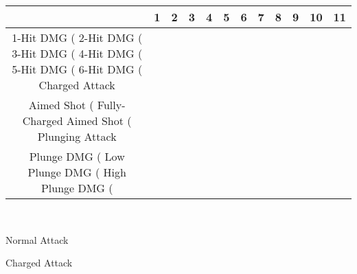 \documentclass[a4paper,12pt]{article}
\begin{document}
\begin{tabular}{|c|c|c|c|c|c|c|c|c|c|c|c|} \hline
 & 1 & 2 & 3 & 4 & 5 & 6 & 7 & 8 & 9 & 10 & 11 \\
 \hline
1-Hit DMG (%
2-Hit DMG (%
3-Hit DMG (%
4-Hit DMG (%
5-Hit DMG (%
6-Hit DMG (%
Charged Attack \\
Aimed Shot (%
Fully-Charged Aimed Shot (%
Plunging Attack \\
Plunge DMG (%
Low Plunge DMG (%
High Plunge DMG (%
\end{tabular}\\ \par \vspace{0.5cm}

Normal Attack\\ \par \vspace{0.5cm}

Charged Attack\\ \par \vspace{0.5cm}
\end{document}
